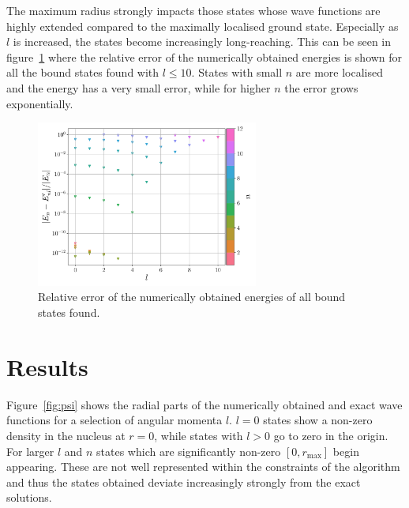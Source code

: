 \documentclass[a4paper,DIV=12,english]{scrartcl}
\begin{document}
The maximum radius strongly impacts those states whose wave functions are highly extended compared to the maximally localised ground state. Especially as $l$ is increased, the states become increasingly long-reaching. This can be seen in figure~\ref{fig:ergerr} where the relative error of the numerically obtained energies is shown for all the bound states found with $l\leq 10$. States with small $n$ are more localised and the energy has a very small error, while for higher $n$ the error grows exponentially.

\begin{figure}
    \centering
    \includegraphics[width=0.65\textwidth]{../plots/erg_err.pdf}
    \caption{Relative error of the numerically obtained energies of all bound states found.}
    \label{fig:ergerr}
\end{figure}

\FloatBarrier
\section{Results}
Figure~\ref{fig:psi} shows the radial parts of the numerically obtained and exact wave functions for a selection of angular momenta $l$. $l=0$ states show a non-zero density in the nucleus at $r=0$, while states with $l>0$ go to zero in the origin. For larger $l$ and $n$ states which are significantly non-zero $[0, r_\text{max}]$ begin appearing. These are not well represented within the constraints of the algorithm and thus the states obtained deviate increasingly strongly from the exact solutions.
\end{document}
